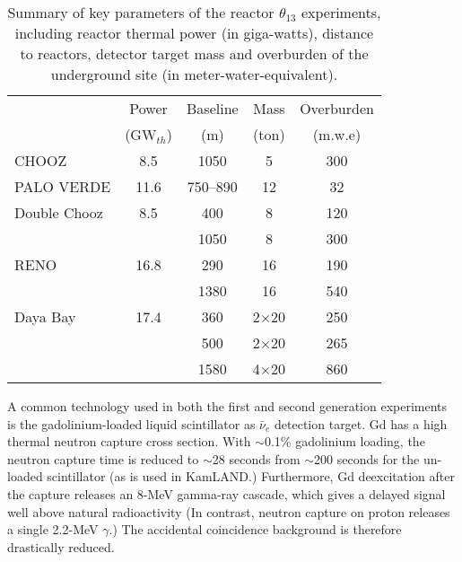 \begin{table}[!htb]
  \begin{tabular}{lcccc}
  \hline
  & Power & Baseline & Mass & Overburden \\
  & (GW$_{th}$) & (m) & (ton) & (m.w.e)    \\
  \hline
  CHOOZ        & 8.5  & 1050  & 5    & 300\\
  PALO VERDE   & 11.6 & 750--890  & 12  & 32\\
  \hline
  Double Chooz & 8.5  & 400  & 8  & 120\\
               &      & 1050 & 8  & 300\\
  RENO         & 16.8 & 290  & 16   & 190\\
               &      & 1380 & 16   & 540\\
  Daya Bay     & 17.4 & 360  & 2$\times$20   & 250\\
               &      & 500  & 2$\times$20   & 265\\
               &      & 1580 & 4$\times$20   & 860\\
  \hline
  \end{tabular}
  \caption{Summary of key parameters of the reactor $\theta_{13}$ experiments, including reactor thermal power (in giga-watts), distance to reactors, detector target mass and overburden of the underground site (in meter-water-equivalent).}
\label{tab:theta13}
\end{table}

A common technology used in both the first and second generation experiments is the gadolinium-loaded liquid scintillator as $\bar\nu_{e}$ detection target. Gd has a high thermal neutron capture cross section. With $\sim$0.1\% gadolinium loading, the neutron capture time is reduced to $\sim$28 seconds from $\sim$200 seconds for the un-loaded scintillator (as is used in KamLAND.) Furthermore, Gd deexcitation after the capture releases an 8-MeV gamma-ray cascade, which gives a delayed signal well above natural radioactivity (In contrast, neutron capture on proton releases a single 2.2-MeV $\gamma$.) The accidental coincidence background is therefore drastically reduced.

